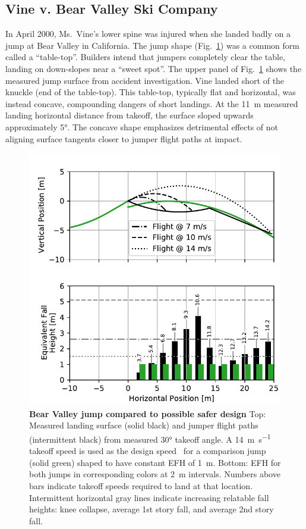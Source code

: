 \documentclass[smallextended]{svjour3}       %
\begin{document}
\subsection{Vine v. Bear Valley Ski Company}
\label{sec:vine}
%
In April 2000, Ms.~Vine's lower spine was injured when she landed badly on a
jump at Bear Valley in California. The jump shape
(Fig.~\ref{fig:vine-v-bear-valley}) was a common form called a ``table-top''.
Builders intend that jumpers completely clear the table, landing on down-slopes
near a ``sweet spot''.  The upper panel of Fig.~\ref{fig:vine-v-bear-valley}
shows the  measured jump surface from accident investigation. Vine landed short
of the knuckle (end of the table-top). This table-top, typically flat and
horizontal, was instead concave, compounding dangers of short landings. At the
11~\si{\meter} measured landing horizontal distance from  takeoff, the surface
sloped upwards approximately 5\si{\degree}. The concave shape emphasizes
detrimental effects of not aligning surface tangents closer to jumper flight
paths at impact.
%
\begin{figure}
  \centering
  \includegraphics[width=\columnwidth]{figures/vine-v-bear-valley.pdf}
  \caption{\textbf{Bear Valley jump compared to possible safer design}
  Top: Measured landing surface (solid black) and jumper flight paths
  (intermittent black) from measured 30\si{\degree} takeoff angle.  A
  14~\si{\meter\per\second} takeoff speed is used as the design
  speed~\cite{Levy2015} for a comparison jump (solid green) shaped to have
  constant EFH of 1~\si{\meter}.
  Bottom: EFH for both jumps in corresponding colors at 2~\si{\meter}
  intervals. Numbers above bars indicate takeoff speeds required to land at
  that location.
  Intermittent horizontal gray lines indicate increasing relatable fall
  heights: knee collapse, average 1st story fall, and average 2nd story fall.
  }
  \label{fig:vine-v-bear-valley}
\end{figure}
\end{document}
